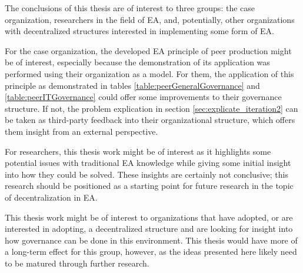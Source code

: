 The conclusions of this thesis are of interest to three groups: the case organization, researchers in the field of EA, and, potentially, other organizations with decentralized structures interested in implementing some form of EA. 

For the case organization, the developed EA principle of peer production might be of interest, especially because the demonstration of its application was performed using their organization as a model. For them, the application of this principle as demonstrated in tables \ref{table:peerGeneralGovernance} and \ref{table:peerITGovernance} could offer some improvements to their governance structure. If not, the problem explication in section \ref{sec:explicate_iteration2} can be taken as third-party feedback into their organizational structure, which offers them insight from an external perspective. 

For researchers, this thesis work might be of interest as it highlights some potential issues with traditional EA knowledge while giving some initial insight into how they could be solved. These insights are certainly not conclusive; this research should be positioned as a starting point for future research in the topic of decentralization in EA. 

This thesis work might be of interest to organizations that have adopted, or are interested in adopting, a decentralized structure and are looking for insight into how governance can be done in this environment. This thesis would have more of a long-term effect for this group, however, as the ideas presented here likely need to be matured through further research.  

